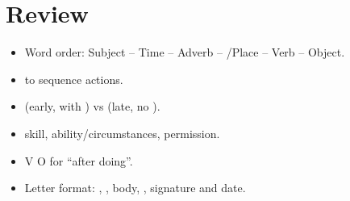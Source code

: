 \begin{example}



\hfill{}

\hfill{}
\end{example}

\section*{Review}
\begin{itemize}
  \item Word order: Subject -- Time -- Adverb -- /Place -- Verb -- Object.
  \item {} to sequence actions.
  \item {} (early, with ) vs  (late, no ).
  \item {} skill,  ability/circumstances,  permission.
  \item V  O  for ``after doing''.
  \item Letter format: , , body, , signature and date.
\end{itemize}
